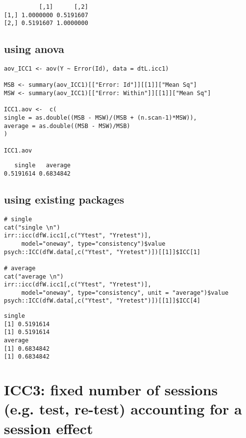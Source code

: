 \documentclass{article}
\begin{document}
\begin{verbatim}
          [,1]      [,2]
[1,] 1.0000000 0.5191607
[2,] 0.5191607 1.0000000
\end{verbatim}

\bigskip

\subsection{using anova}
\label{sec:org5e331b9}
\lstset{language=r,label= ,caption= ,captionpos=b,numbers=none}
\begin{lstlisting}
aov_ICC1 <- aov(Y ~ Error(Id), data = dtL.icc1) 

MSB <- summary(aov_ICC1)[["Error: Id"]][[1]]["Mean Sq"]
MSW <- summary(aov_ICC1)[["Error: Within"]][[1]]["Mean Sq"]

ICC1.aov <-  c(
single = as.double((MSB - MSW)/(MSB + (n.scan-1)*MSW)),
average = as.double((MSB - MSW)/MSB)
)

ICC1.aov
\end{lstlisting}

\begin{verbatim}
   single   average 
0.5191614 0.6834842
\end{verbatim}

\bigskip

\subsection{using existing packages}
\label{sec:org4216525}
\lstset{language=r,label= ,caption= ,captionpos=b,numbers=none}
\begin{lstlisting}
# single
cat("single \n")
irr::icc(dfW.icc1[,c("Ytest", "Yretest")],
	 model="oneway", type="consistency")$value
psych::ICC(dfW.data[,c("Ytest", "Yretest")])[[1]]$ICC[1]

# average
cat("average \n")
irr::icc(dfW.icc1[,c("Ytest", "Yretest")],
	 model="oneway", type="consistency", unit = "average")$value
psych::ICC(dfW.data[,c("Ytest", "Yretest")])[[1]]$ICC[4]
\end{lstlisting}

\begin{verbatim}
single
[1] 0.5191614
[1] 0.5191614
average
[1] 0.6834842
[1] 0.6834842
\end{verbatim}

\clearpage

\section{ICC3: fixed number of sessions (e.g. test, re-test) accounting for a session effect}
\label{sec:org0aefc87}
\end{document}
